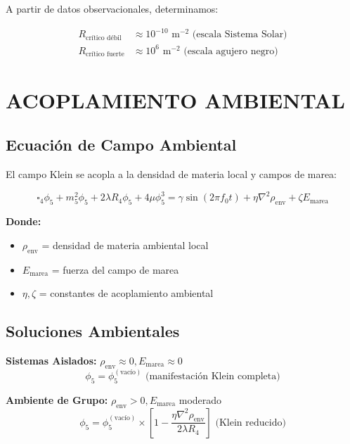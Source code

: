 \documentclass[12pt,a4paper]{article}
\begin{document}
A partir de datos observacionales, determinamos:

\begin{align}
R_{\text{crítico débil}} &\approx 10^{-10} \text{ m}^{-2} \text{ (escala Sistema Solar)}\\
R_{\text{crítico fuerte}} &\approx 10^6 \text{ m}^{-2} \text{ (escala agujero negro)}
\end{align}

\section{ACOPLAMIENTO AMBIENTAL}

\subsection{Ecuación de Campo Ambiental}

El campo Klein se acopla a la densidad de materia local y campos de marea:

\begin{equation}
\square_4\phi_5 + m_5^2\phi_5 + 2\lambda R_4\phi_5 + 4\mu\phi_5^3 = \gamma \sin(2\pi f_0 t) + \eta\nabla^2\rho_{\text{env}} + \zeta E_{\text{marea}}
\end{equation}

\textbf{Donde:}
\begin{itemize}
\item $\rho_{\text{env}}$ = densidad de materia ambiental local
\item $E_{\text{marea}}$ = fuerza del campo de marea
\item $\eta, \zeta$ = constantes de acoplamiento ambiental
\end{itemize}

\subsection{Soluciones Ambientales}

\textbf{Sistemas Aislados:} $\rho_{\text{env}} \approx 0, E_{\text{marea}} \approx 0$
\begin{equation}
\phi_5 = \phi_5^{(\text{vacío})} \text{ (manifestación Klein completa)}
\end{equation}

\textbf{Ambiente de Grupo:} $\rho_{\text{env}} > 0, E_{\text{marea}}$ moderado
\begin{equation}
\phi_5 = \phi_5^{(\text{vacío})} \times \left[1 - \frac{\eta\nabla^2\rho_{\text{env}}}{2\lambda R_4}\right] \text{ (Klein reducido)}
\end{equation}
\end{document}
